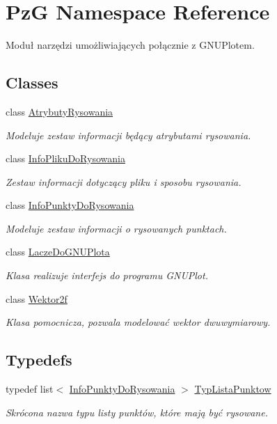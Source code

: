 \hypertarget{namespace_pz_g}{}\section{PzG Namespace Reference}
\label{namespace_pz_g}


Moduł narzędzi umożliwiających połącznie z G\+N\+U\+Plotem.  


\subsection*{Classes}
\begin{DoxyCompactItemize}
\item 
class \mbox{\hyperlink{class_pz_g_1_1_atrybuty_rysowania}{Atrybuty\+Rysowania}}
\begin{DoxyCompactList}\small\item\em Modeluje zestaw informacji będący atrybutami rysowania. \end{DoxyCompactList}\item 
class \mbox{\hyperlink{class_pz_g_1_1_info_pliku_do_rysowania}{Info\+Pliku\+Do\+Rysowania}}
\begin{DoxyCompactList}\small\item\em Zestaw informacji dotyczący pliku i sposobu rysowania. \end{DoxyCompactList}\item 
class \mbox{\hyperlink{class_pz_g_1_1_info_punkty_do_rysowania}{Info\+Punkty\+Do\+Rysowania}}
\begin{DoxyCompactList}\small\item\em Modeluje zestaw informacji o rysowanych punktach. \end{DoxyCompactList}\item 
class \mbox{\hyperlink{class_pz_g_1_1_lacze_do_g_n_u_plota}{Lacze\+Do\+G\+N\+U\+Plota}}
\begin{DoxyCompactList}\small\item\em Klasa realizuje interfejs do programu G\+N\+U\+Plot. \end{DoxyCompactList}\item 
class \mbox{\hyperlink{class_pz_g_1_1_wektor2f}{Wektor2f}}
\begin{DoxyCompactList}\small\item\em Klasa pomocnicza, pozwala modelować wektor dwuwymiarowy. \end{DoxyCompactList}\end{DoxyCompactItemize}
\subsection*{Typedefs}
\begin{DoxyCompactItemize}
\item 
typedef list$<$ \mbox{\hyperlink{class_pz_g_1_1_info_punkty_do_rysowania}{Info\+Punkty\+Do\+Rysowania}} $>$ \mbox{\hyperlink{namespace_pz_g_a663e923efc195ea10f6f7086c6da490b}{Typ\+Lista\+Punktow}}
\begin{DoxyCompactList}\small\item\em Skrócona nazwa typu listy punktów, które mają być rysowane. \end{DoxyCompactList}\end{DoxyCompactItemize}
